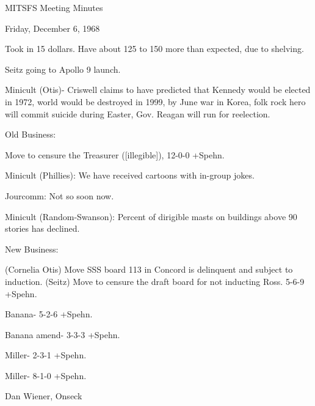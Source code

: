\documentclass[12pt]{article}
\begin{document}
\begin{center}

MITSFS Meeting Minutes

Friday, December 6, 1968

\end{center}
 
\vspace{12pt}

\setlength{\parskip}{6pt}

\noindent
Took in 15 dollars. Have about 125 to 150 more than expected, due to shelving.

Seitz going to Apollo 9 launch.

Minicult (Otis)- Criswell claims to have predicted that Kennedy would be elected in 1972, world would be destroyed in 1999, by June war in Korea, folk rock hero will commit suicide during Easter, Gov. Reagan will run for reelection.

Old Business:

Move to censure the Treasurer ([illegible]), 12-0-0 +Spehn.

Minicult (Phillies): We have received cartoons with in-group jokes.

Jourcomm: Not so soon now.

Minicult (Random-Swanson): Percent of dirigible masts on buildings above 90 stories has declined.

New Business:

(Cornelia Otis) Move SSS board 113 in Concord is delinquent and subject to induction. (Seitz) Move to censure the draft board for not inducting Ross. 5-6-9 +Spehn.

Banana- 5-2-6 +Spehn.

Banana amend- 3-3-3 +Spehn.

Miller- 2-3-1 +Spehn.

Miller- 8-1-0 +Spehn.

\vspace{12pt}

\centerline{Dan Wiener, Onseck}
\end{document}
